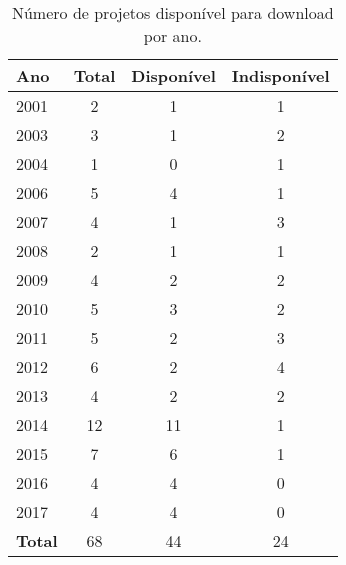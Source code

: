 \begin{table}[h]
\caption{Número de projetos disponível para download por ano.}
\centering
\begin{tabular}{l c c c}
  \hline
  {\bf Ano} & {\bf Total} & {\bf Disponível} & {\bf Indisponível} \\
  \hline
  2001 & 2 & 1 & 1 \\
  2003 & 3 & 1 & 2 \\
  2004 & 1 & 0 & 1 \\
  2006 & 5 & 4 & 1 \\
  2007 & 4 & 1 & 3 \\
  2008 & 2 & 1 & 1 \\
  2009 & 4 & 2 & 2 \\
  2010 & 5 & 3 & 2 \\
  2011 & 5 & 2 & 3 \\
  2012 & 6 & 2 & 4 \\
  2013 & 4 & 2 & 2 \\
  2014 & 12 & 11 & 1 \\
  2015 & 7 & 6 & 1 \\
  2016 & 4 & 4 & 0 \\
  2017 & 4 & 4 & 0 \\
  \hline
  {\bf Total} & 68 & 44 & 24 \\
  \hline
\end{tabular}
\label{available-table}
\end{table}

